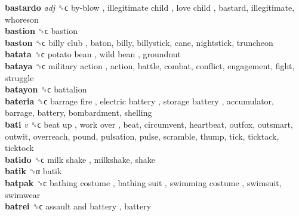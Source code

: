 \textbf{bastardo} \emph{adj}  ␝ϲ   by-blow ,  illegitimate child ,  love child , bastard, illegitimate, whoreson  \\
\textbf{bastion} ␝ϲ  bastion  \\
\textbf{baston} ␝ϲ   billy club , baton, billy, billystick, cane, nightstick, truncheon  \\
\textbf{batata} ␝ϲ   potato bean ,  wild bean , groundnut  \\
\textbf{bataya} ␝ϲ   military action , action, battle, combat, conflict, engagement, fight, struggle  \\
\textbf{batayon} ␝ϲ  battalion  \\
\textbf{bateria} ␝ϲ   barrage fire ,  electric battery ,  storage battery , accumulator, barrage, battery, bombardment, shelling  \\
\textbf{bati} \emph{v}  ␝ϲ   beat up ,  work over , beat, circumvent, heartbeat, outfox, outsmart, outwit, overreach, pound, pulsation, pulse, scramble, thump, tick, ticktack, ticktock  \\
\textbf{batido} ␝ϲ   milk shake , milkshake, shake  \\
\textbf{batik} ␝α  batik  \\
\textbf{batpak} ␝ϲ   bathing costume ,  bathing suit ,  swimming costume , swimsuit, swimwear  \\
\textbf{batrei} ␝ϲ   assault and battery , battery  \\
